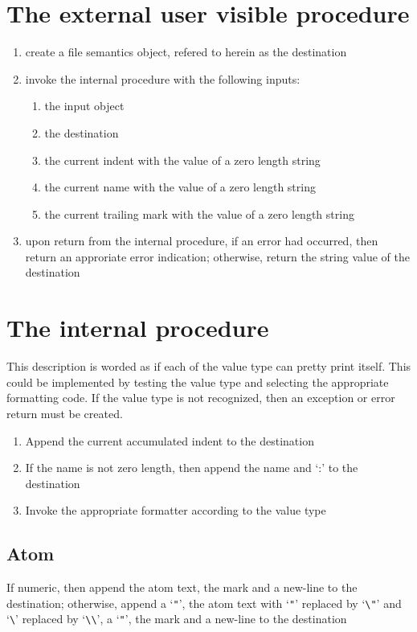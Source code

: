 \documentclass[12pt]{article}
\begin{document}
\section*{The external user visible procedure}
\begin{enumerate}
\item create a file semantics object, refered to herein as the destination
\item invoke the internal procedure with the following inputs:
\begin{enumerate}
\item the input object
\item the destination
\item the current indent with the value of a zero length string
\item the current name with the value of a zero length string
\item the current trailing mark with the value of a zero length string
\end{enumerate}
\item upon return from the internal procedure, if an error had occurred,
      then return an approriate error indication; otherwise, return the
      string value of the destination
\end{enumerate}
\section*{The internal procedure}
This description is worded as if each of the value type can pretty print itself.
This could be implemented by testing the value type and selecting the
appropriate formatting code.
If the value type is not recognized,
then an exception or error return must be created.

\begin{enumerate}
\item Append the current accumulated indent to the destination
\item If the name is not zero length,
      then append the name and `:\textvisiblespace' to the destination
\item Invoke the appropriate formatter according to the value type
\end{enumerate}

\subsection*{Atom}
If numeric, then append the atom text, the mark and a new-line to the
destination;
otherwise, append a `\verb+"+',
the atom text with `\verb+"+' replaced by `\verb+\"+'
and `\verb+\+' replaced by `\verb+\\+',
a `\verb+"+', the mark and a new-line to the destination
\end{document}
